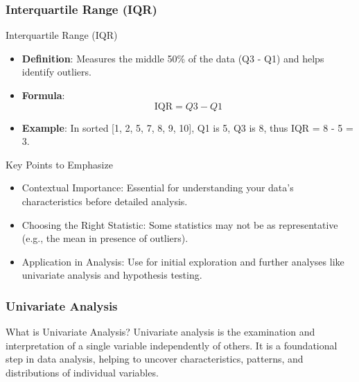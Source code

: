 \documentclass{beamer}
\begin{document}
\begin{frame}[fragile]
    \frametitle{Interquartile Range (IQR)}
    \begin{block}{Interquartile Range (IQR)}
        \begin{itemize}
            \item \textbf{Definition}: Measures the middle 50\% of the data (Q3 - Q1) and helps identify outliers.
            \item \textbf{Formula}:
            \[
            \text{IQR} = Q3 - Q1
            \]
            \item \textbf{Example}: In sorted [1, 2, 5, 7, 8, 9, 10], Q1 is 5, Q3 is 8, thus IQR = 8 - 5 = 3.
        \end{itemize}
    \end{block}

    \begin{block}{Key Points to Emphasize}
        \begin{itemize}
            \item Contextual Importance: Essential for understanding your data's characteristics before detailed analysis.
            \item Choosing the Right Statistic: Some statistics may not be as representative (e.g., the mean in presence of outliers).
            \item Application in Analysis: Use for initial exploration and further analyses like univariate analysis and hypothesis testing.
        \end{itemize}
    \end{block}
\end{frame}

\begin{frame}[fragile]
    \frametitle{Univariate Analysis}
    \begin{block}{What is Univariate Analysis?}
        Univariate analysis is the examination and interpretation of a single variable independently of others. 
        It is a foundational step in data analysis, helping to uncover characteristics, patterns, and distributions of individual variables.
    \end{block}
\end{frame}
\end{document}
